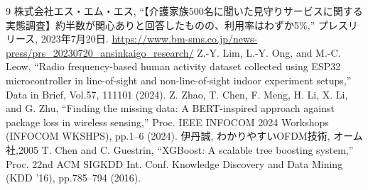 \documentclass[uplatex, 12pt]{ujbook}
\begin{document}
\begin{thebibliography}{9}
株式会社エス・エム・エス, ``【介護家族500名に聞いた見守りサービスに関する実態調査】約半数が関心ありと回答したものの、利用率はわずか5\%,'' プレスリリース, 2023年7月20日.
\url{https://www.bm-sms.co.jp/news-press/prs_20230720_ansinkaigo_research/}
Z.-Y. Lim, L.-Y. Ong, and M.-C. Leow, ``Radio frequency-based human activity dataset collected using ESP32 microcontroller in line-of-sight and non-line-of-sight indoor experiment setups,''
Data in Brief, Vol.57, 111101 (2024).
Z. Zhao, T. Chen, F. Meng, H. Li, X. Li, and G. Zhu, ``Finding the missing data: A BERT-inspired approach against package loss in wireless sensing,''
Proc. IEEE INFOCOM 2024 Workshops (INFOCOM WKSHPS), pp.1--6 (2024).
伊丹誠, わかりやすいOFDM技術, オーム社,2005
T. Chen and C. Guestrin, ``XGBoost: A scalable tree boosting system,''
Proc. 22nd ACM SIGKDD Int. Conf. Knowledge Discovery and Data Mining (KDD '16), pp.785--794 (2016).

\end{thebibliography}
\end{document}
